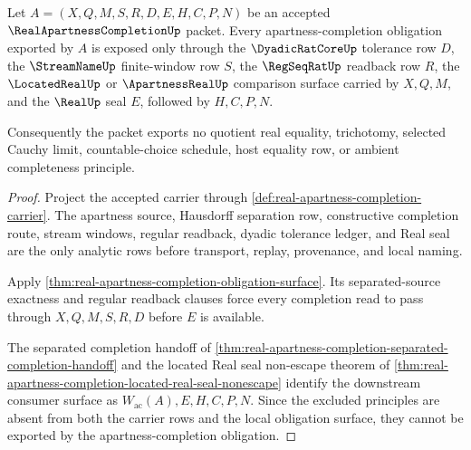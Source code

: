 \begin{theorem}
\label{thm:real-apartness-completion-finite-apartness-completion-obligation}
Let $A=(X,Q,M,S,R,D,E,H,C,P,N)$ be an accepted $\RealApartnessCompletionUp$ packet. Every apartness-completion obligation exported by $A$ is exposed only through the $\DyadicRatCoreUp$ tolerance row $D$, the $\StreamNameUp$ finite-window row $S$, the $\RegSeqRatUp$ readback row $R$, the $\LocatedRealUp$ or $\ApartnessRealUp$ comparison surface carried by $X,Q,M$, and the $\RealUp$ seal $E$, followed by $H,C,P,N$.

Consequently the packet exports no quotient real equality, trichotomy, selected Cauchy limit, countable-choice schedule, host equality row, or ambient completeness principle.
\end{theorem}
\begin{proof}
Project the accepted carrier through \autoref{def:real-apartness-completion-carrier}. The apartness source, Hausdorff separation row, constructive completion route, stream windows, regular readback, dyadic tolerance ledger, and Real seal are the only analytic rows before transport, replay, provenance, and local naming.

Apply \autoref{thm:real-apartness-completion-obligation-surface}. Its separated-source exactness and regular readback clauses force every completion read to pass through $X,Q,M,S,R,D$ before $E$ is available.

The separated completion handoff of \autoref{thm:real-apartness-completion-separated-completion-handoff} and the located Real seal non-escape theorem of \autoref{thm:real-apartness-completion-located-real-seal-nonescape} identify the downstream consumer surface as $W_{\mathrm{ac}}(A),E,H,C,P,N$. Since the excluded principles are absent from both the carrier rows and the local obligation surface, they cannot be exported by the apartness-completion obligation.
\end{proof}

